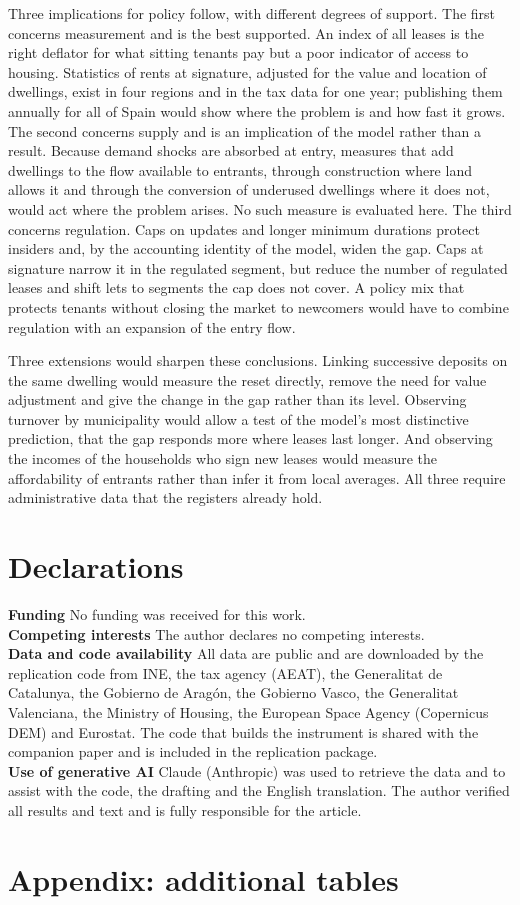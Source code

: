 \documentclass[11pt,a4paper]{article}
\begin{document}
Three implications for policy follow, with different degrees of support. The first concerns measurement and is the best supported. An index of all leases is the right deflator for what sitting tenants pay but a poor indicator of access to housing. Statistics of rents at signature, adjusted for the value and location of dwellings, exist in four regions and in the tax data for one year; publishing them annually for all of Spain would show where the problem is and how fast it grows. The second concerns supply and is an implication of the model rather than a result. Because demand shocks are absorbed at entry, measures that add dwellings to the flow available to entrants, through construction where land allows it and through the conversion of underused dwellings where it does not, would act where the problem arises. No such measure is evaluated here. The third concerns regulation. Caps on updates and longer minimum durations protect insiders and, by the accounting identity of the model, widen the gap. Caps at signature narrow it in the regulated segment, but reduce the number of regulated leases and shift lets to segments the cap does not cover. A policy mix that protects tenants without closing the market to newcomers would have to combine regulation with an expansion of the entry flow.

Three extensions would sharpen these conclusions. Linking successive deposits on the same dwelling would measure the reset directly, remove the need for value adjustment and give the change in the gap rather than its level. Observing turnover by municipality would allow a test of the model's most distinctive prediction, that the gap responds more where leases last longer. And observing the incomes of the households who sign new leases would measure the affordability of entrants rather than infer it from local averages. All three require administrative data that the registers already hold.

\section*{Declarations}
\noindent\textbf{Funding} No funding was received for this work.\\
\textbf{Competing interests} The author declares no competing interests.\\
\textbf{Data and code availability} All data are public and are downloaded by the replication code from INE, the tax agency (AEAT), the Generalitat de Catalunya, the Gobierno de Aragón, the Gobierno Vasco, the Generalitat Valenciana, the Ministry of Housing, the European Space Agency (Copernicus DEM) and Eurostat. The code that builds the instrument is shared with the companion paper and is included in the replication package.\\
\textbf{Use of generative AI} Claude (Anthropic) was used to retrieve the data and to assist with the code, the drafting and the English translation. The author verified all results and text and is fully responsible for the article.



\clearpage
\appendix
\renewcommand{\thetable}{A\arabic{table}}\setcounter{table}{0}
\section*{Appendix: additional tables}


\end{document}
